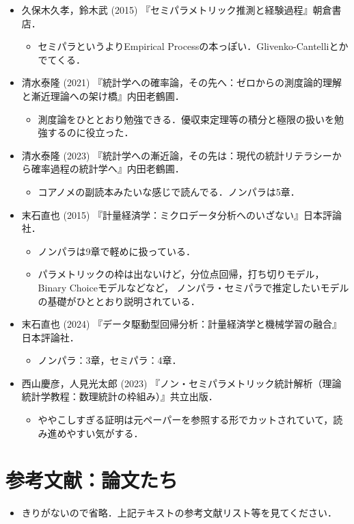 \documentclass[a4paper,10pt]{jarticle}
\begin{document}
\begin{itemize}
  \item 久保木久孝，鈴木武 (2015) 『セミパラメトリック推測と経験過程』朝倉書店．
        \begin{itemize}
          \item セミパラというよりEmpirical Processの本っぽい．Glivenko-Cantelliとかでてくる．
        \end{itemize}  
  
  \item 清水泰隆 (2021) 『統計学への確率論，その先へ：ゼロからの測度論的理解と漸近理論への架け橋』内田老鶴圃．
        \begin{itemize}
          \item 測度論をひととおり勉強できる．優収束定理等の積分と極限の扱いを勉強するのに役立った．
        \end{itemize} 
    
  \item 清水泰隆 (2023) 『統計学への漸近論，その先は：現代の統計リテラシーから確率過程の統計学へ』内田老鶴圃．
        \begin{itemize}
          \item コアノメの副読本みたいな感じで読んでる．ノンパラは5章．
        \end{itemize}

  \item 末石直也 (2015) 『計量経済学：ミクロデータ分析へのいざない』日本評論社．
        \begin{itemize}
          \item ノンパラは9章で軽めに扱っている．
          \item パラメトリックの枠は出ないけど，分位点回帰，打ち切りモデル，Binary Choiceモデルなどなど，
                ノンパラ・セミパラで推定したいモデルの基礎がひととおり説明されている．
        \end{itemize}
  
  \item 末石直也 (2024) 『データ駆動型回帰分析：計量経済学と機械学習の融合』日本評論社．
        \begin{itemize}
          \item ノンパラ：3章，セミパラ：4章．
        \end{itemize}

  \item 西山慶彦，人見光太郎 (2023) 『ノン・セミパラメトリック統計解析（理論統計学教程：数理統計の枠組み）』共立出版．
        \begin{itemize}
          \item ややこしすぎる証明は元ペーパーを参照する形でカットされていて，読み進めやすい気がする．
        \end{itemize}
\end{itemize}

\section{参考文献：論文たち}

\begin{itemize}
  \item きりがないので省略．上記テキストの参考文献リスト等を見てください．
\end{itemize}
\end{document}
